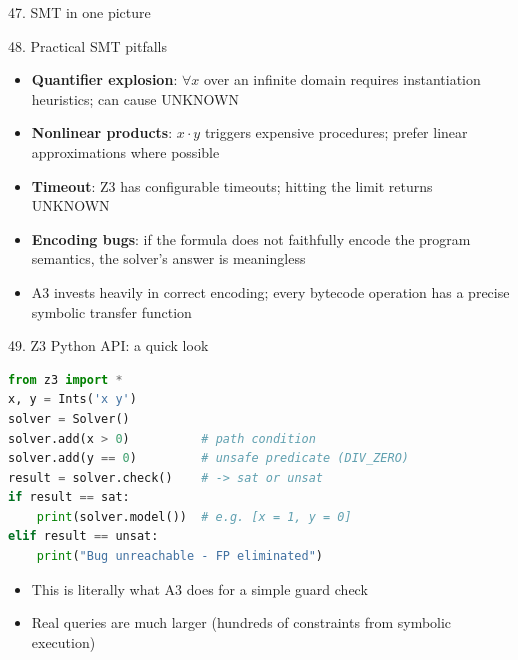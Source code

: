 \documentclass[aspectratio=169]{beamer}
\begin{document}
\begin{frame}{47. SMT in one picture}
\begin{center}
\end{center}
\end{frame}

\begin{frame}{48. Practical SMT pitfalls}
\begin{itemize}
  \item \textbf{Quantifier explosion}: \(\forall x\) over an infinite domain requires instantiation heuristics; can cause UNKNOWN
  \item \textbf{Nonlinear products}: \(x \cdot y\) triggers expensive procedures; prefer linear approximations where possible
  \item \textbf{Timeout}: Z3 has configurable timeouts; hitting the limit returns UNKNOWN
  \item \textbf{Encoding bugs}: if the formula does not faithfully encode the program semantics, the solver's answer is meaningless
  \item A3 invests heavily in correct encoding; every bytecode operation has a precise symbolic transfer function
\end{itemize}
\end{frame}

\begin{frame}[fragile]{49. Z3 Python API: a quick look}
\begin{lstlisting}[language=Python]
from z3 import *
x, y = Ints('x y')
solver = Solver()
solver.add(x > 0)          # path condition
solver.add(y == 0)         # unsafe predicate (DIV_ZERO)
result = solver.check()    # -> sat or unsat
if result == sat:
    print(solver.model())  # e.g. [x = 1, y = 0]
elif result == unsat:
    print("Bug unreachable - FP eliminated")
\end{lstlisting}
\begin{itemize}
  \item This is literally what A3 does for a simple guard check
  \item Real queries are much larger (hundreds of constraints from symbolic execution)
\end{itemize}
\end{frame}
\end{document}
